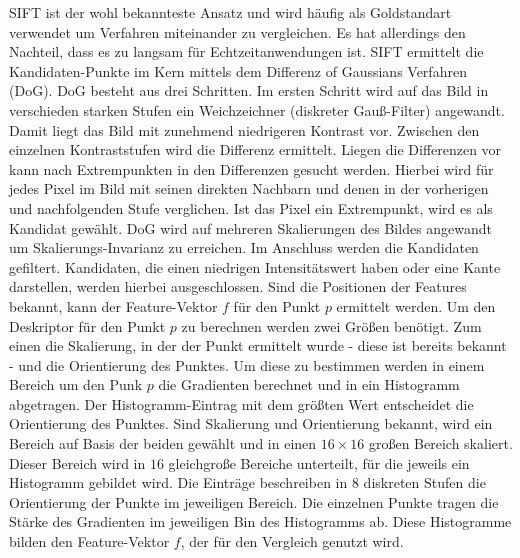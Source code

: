 \documentclass[12pt,titlepage, twoside]{article}
\begin{document}
SIFT ist der wohl bekannteste Ansatz und wird häufig als Goldstandart verwendet um Verfahren miteinander zu vergleichen. Es hat allerdings den Nachteil, dass es zu langsam für Echtzeitanwendungen ist.
SIFT ermittelt die Kandidaten-Punkte im Kern mittels dem Differenz of Gaussians Verfahren (DoG). DoG besteht aus drei Schritten. Im ersten Schritt wird auf das Bild in verschieden starken Stufen ein Weichzeichner (diskreter Gauß-Filter) angewandt.
Damit liegt das Bild mit zunehmend niedrigeren Kontrast vor. Zwischen den einzelnen Kontraststufen wird die Differenz ermittelt. Liegen die Differenzen vor kann nach Extrempunkten in den Differenzen gesucht werden.
Hierbei wird für jedes Pixel im Bild mit seinen direkten Nachbarn und denen in der vorherigen und nachfolgenden Stufe verglichen. Ist das Pixel ein Extrempunkt, wird es als Kandidat gewählt.
DoG wird auf mehreren Skalierungen des Bildes angewandt um Skalierungs-Invarianz zu erreichen.
Im Anschluss werden die Kandidaten gefiltert. Kandidaten, die einen niedrigen Intensitätswert haben oder eine Kante darstellen, werden hierbei ausgeschlossen.
Sind die Positionen der Features bekannt, kann der Feature-Vektor $f$ für den Punkt $p$ ermittelt werden. 
Um den Deskriptor für den Punkt $p$ zu berechnen werden zwei Größen benötigt. Zum einen die Skalierung, in der der Punkt ermittelt wurde - diese ist bereits bekannt - und die Orientierung des Punktes.
Um diese zu bestimmen werden in einem Bereich um den Punk $p$ die Gradienten berechnet und in ein Histogramm abgetragen. Der Histogramm-Eintrag mit dem größten Wert entscheidet die Orientierung des Punktes.
Sind Skalierung und Orientierung bekannt, wird ein Bereich auf Basis der beiden gewählt und in einen $16\times 16$ großen Bereich skaliert. 
Dieser Bereich wird in $16$ gleichgroße Bereiche unterteilt, für die jeweils ein Histogramm gebildet wird. 
Die Einträge beschreiben in $8$ diskreten Stufen die Orientierung der Punkte im jeweiligen Bereich. 
Die einzelnen Punkte tragen die Stärke des Gradienten im jeweiligen Bin des Histogramms ab.
Diese Histogramme bilden den Feature-Vektor $f$, der für den Vergleich genutzt wird.
\end{document}
